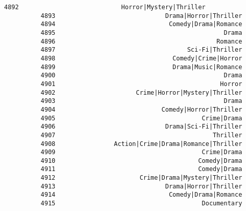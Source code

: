 \documentclass[11pt]{article}
\begin{document}
\begin{Verbatim}[commandchars=\\\{\}]
          4892                            Horror|Mystery|Thriller   
          4893                              Drama|Horror|Thriller   
          4894                               Comedy|Drama|Romance   
          4895                                              Drama   
          4896                                            Romance   
          4897                                    Sci-Fi|Thriller   
          4898                                Comedy|Crime|Horror   
          4899                                Drama|Music|Romance   
          4900                                              Drama   
          4901                                             Horror   
          4902                      Crime|Horror|Mystery|Thriller   
          4903                                              Drama   
          4904                             Comedy|Horror|Thriller   
          4905                                        Crime|Drama   
          4906                              Drama|Sci-Fi|Thriller   
          4907                                           Thriller   
          4908                Action|Crime|Drama|Romance|Thriller   
          4909                                        Crime|Drama   
          4910                                       Comedy|Drama   
          4911                                       Comedy|Drama   
          4912                       Crime|Drama|Mystery|Thriller   
          4913                              Drama|Horror|Thriller   
          4914                               Comedy|Drama|Romance   
          4915                                        Documentary   
          

\end{Verbatim}
\end{document}
